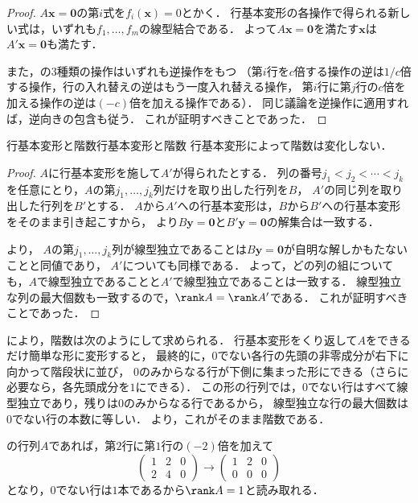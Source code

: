 \begin{leftbar}
\begin{proof}
  $A\bm{x} = \bm{0}$の第$i$式を$f_i(\bm{x}) = 0$とかく．
  行基本変形の各操作で得られる新しい式は，いずれも$f_1, \dots, f_m$の線型結合である．
  よって$A\bm{x} = \bm{0}$を満たす$\bm{x}$は$A'\bm{x} = \bm{0}$も満たす．

  また，の$3$種類の操作はいずれも逆操作をもつ
  （第$i$行を$c$倍する操作の逆は$1/c$倍する操作，行の入れ替えの逆はもう一度入れ替える操作，
  第$i$行に第$j$行の$c$倍を加える操作の逆は$(-c)$倍を加える操作である）．
  同じ議論を逆操作に適用すれば，逆向きの包含も従う．
  これが証明すべきことであった．
\end{proof}
\end{leftbar}

\begin{theorem}{行基本変形と階数}{行基本変形と階数}
  行基本変形によって階数は変化しない．
\end{theorem}

\begin{leftbar}
\begin{proof}
  $A$に行基本変形を施して$A'$が得られたとする．
  列の番号$j_1 < j_2 < \cdots < j_k$を任意にとり，$A$の第$j_1, \dots, j_k$列だけを取り出した行列を$B$，
  $A'$の同じ列を取り出した行列を$B'$とする．
  $A$から$A'$への行基本変形は，$B$から$B'$への行基本変形をそのまま引き起こすから，
  より$B\bm{y} = \bm{0}$と$B'\bm{y} = \bm{0}$の解集合は一致する．

  より，
  $A$の第$j_1, \dots, j_k$列が線型独立であることは$B\bm{y} = \bm{0}$が自明な解しかもたないことと同値であり，
  $A'$についても同様である．
  よって，どの列の組についても，$A$で線型独立であることと$A'$で線型独立であることは一致する．
  線型独立な列の最大個数も一致するので，$\rank A = \rank A'$である．
  これが証明すべきことであった．
\end{proof}
\end{leftbar}

\begin{remark}[行基本変形による階数の計算]
  により，階数は次のようにして求められる．
  行基本変形をくり返して$A$をできるだけ簡単な形に変形すると，
  最終的に，$0$でない各行の先頭の非零成分が右下に向かって階段状に並び，
  $0$のみからなる行が下側に集まった形にできる（さらに必要なら，各先頭成分を$1$にできる）．
  この形の行列では，$0$でない行はすべて線型独立であり，残りは$0$のみからなる行であるから，
  線型独立な行の最大個数は$0$でない行の本数に等しい．
  より，これがそのまま階数である．

  の行列$A$であれば，第$2$行に第$1$行の$(-2)$倍を加えて
  \[
    \begin{pmatrix} 1 & 2 & 0 \\ 2 & 4 & 0 \end{pmatrix}
    \longrightarrow
    \begin{pmatrix} 1 & 2 & 0 \\ 0 & 0 & 0 \end{pmatrix}
  \]
  となり，$0$でない行は$1$本であるから$\rank A = 1$と読み取れる．
\end{remark}

